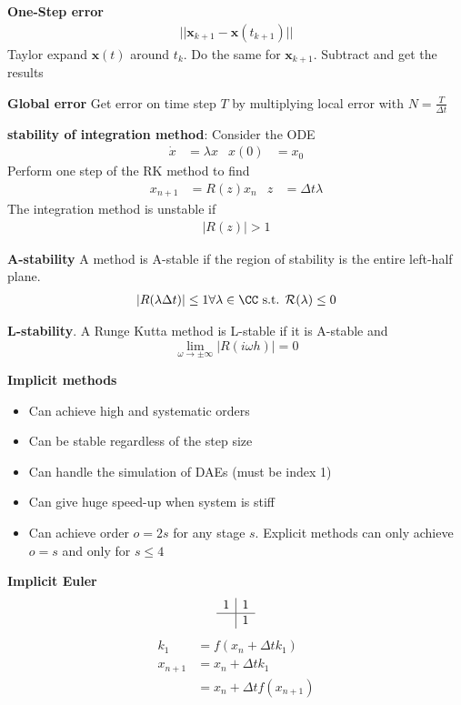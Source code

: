 \textbf{One-Step error}
\begin{align*}
    ||\bm{x}_{k+1}-\bm{x}(t_{k+1})||
\end{align*}
Taylor expand \(\bm{x}(t)\) around \(t_k\). Do the same for \(\bm{x}_{k+1}\). Subtract and get the results
\newline

\textbf{Global error}
Get error on time step \(T\) by multiplying local error with \(N=\frac{T}{\Delta t}\)
\newline

\textbf{stability of integration method}: Consider the ODE
\begin{align*}
    \dot{x}&=\lambda x & x(0) &= x_0
\end{align*}
Perform one step of the RK method to find
\begin{align*}
    x_{n+1} &= R(z)x_n & z &= \Delta t \lambda
\end{align*}
The integration method is unstable if
\begin{align*}
    |R(z)| > 1
\end{align*}

\textbf{A-stability}
A method is A-stable if the region of stability is the entire left-half plane.
\begin{align*}
    |R(\lambda\Delta t)|\leq 1 \forall \lambda \in \CC \textrm{ s.t. } \mathcal{R}(\lambda) \leq 0
\end{align*}

\textbf{L-stability}.
A Runge Kutta method is L-stable if it is A-stable and
\[\lim_{\omega \rightarrow \pm \infty}|R(i\omega h)|= 0\]

\textbf{Implicit methods}
\begin{itemize}
    \item Can achieve high and systematic orders
    \item Can be stable regardless of the step size 
    \item Can handle the simulation of DAEs (must be index 1)
    \item Can give huge speed-up when system is stiff
    \item Can achieve order \(o=2s\) for any stage \(s\). Explicit methods can only achieve \(o=s\) and only for \(s\leq4\)
\end{itemize}

\textbf{Implicit Euler}
\begin{align*}
\begin{array}{c|cc}
    1 & 1\\ \hline
     & 1
\end{array}
\end{align*}
\begin{align*}
    k_1 &= f(x_n + \Delta t k_1) \\
    x_{n+1} &= x_n + \Delta t k_1 \\
    &= x_n + \Delta t f(x_{n+1})
\end{align*}

